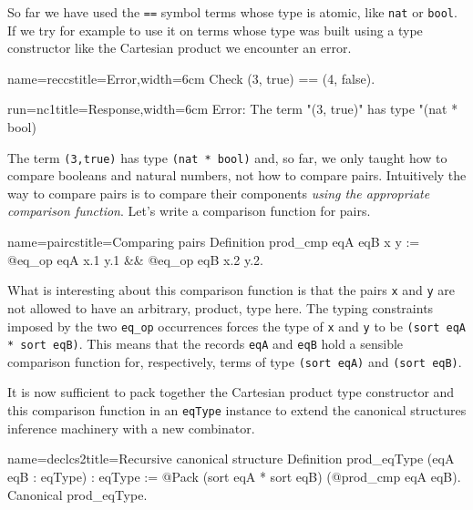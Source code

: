 So far we have used the \lstinline/==/ symbol terms whose type is
atomic, like \lstinline/nat/ or \lstinline/bool/.  If we try for
example to use it on terms whose type was built using a type
constructor like the Cartesian product we encounter an error.

\begin{coq}{name=reccs}{title=Error,width=6cm}
Check (3, true) == (4, false).
$~$
\end{coq}
\begin{coqout}{run=nc1}{title=Response,width=6cm}
Error: The term "(3, true)" has type "(nat * bool)%
\end{coqout}

The term \lstinline/(3,true)/ has type \lstinline/(nat * bool)/ and,
so far, we only taught \Coq{} how to compare booleans and natural
numbers, not how to compare pairs.
Intuitively the way to compare pairs is to compare their components
\emph{using the appropriate comparison function}.
Let's write a comparison function for pairs. 

\begin{coq}{name=paircs}{title=Comparing pairs}
Definition prod_cmp eqA eqB x y :=
  @eq_op eqA x.1 y.1 && @eq_op eqB x.2 y.2.
\end{coq}

What is interesting about this comparison function is that the
pairs \lstinline/x/ and \lstinline/y/ are not allowed to have
an arbitrary, product, type here.  The typing constraints imposed
by the two \lstinline/eq_op/ occurrences forces the type of
\lstinline/x/ and \lstinline/y/ to be
\lstinline/(sort eqA * sort eqB)/.  This means
that the records \lstinline/eqA/ and \lstinline/eqB/ hold
a sensible comparison function for, respectively, terms of
type \lstinline/(sort eqA)/ and \lstinline/(sort eqB)/.

It is now sufficient to pack together the Cartesian product type
constructor and this comparison function in an \lstinline/eqType/
instance to extend the canonical structures inference machinery
with a new combinator.

\begin{coq}{name=declcs2}{title=Recursive canonical structure}
Definition prod_eqType (eqA eqB : eqType) : eqType :=
  @Pack (sort eqA * sort eqB) (@prod_cmp eqA eqB).
Canonical prod_eqType.
\end{coq}

